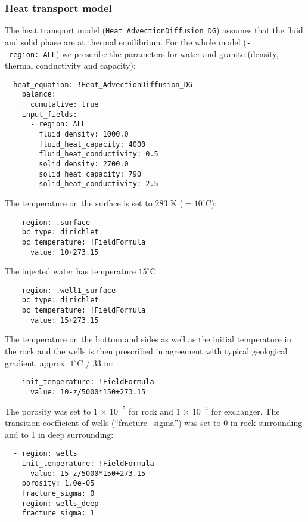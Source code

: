 \subsubsection{Heat transport model}\label{heat-transport-model}

The heat transport model (\texttt{Heat\_AdvectionDiffusion\_DG}) assumes
that the fluid and solid phase are at thermal equilibrium. For the whole
model (\texttt{-\ region:\ ALL}) we prescribe the parameters for water
and granite (density, thermal conductivity and capacity):

\begin{verbatim}
  heat_equation: !Heat_AdvectionDiffusion_DG
    balance:
      cumulative: true
    input_fields:
      - region: ALL
        fluid_density: 1000.0
        fluid_heat_capacity: 4000
        fluid_heat_conductivity: 0.5
        solid_density: 2700.0
        solid_heat_capacity: 790
        solid_heat_conductivity: 2.5
\end{verbatim}

The temperature on the surface is set to 283 K (\(=10^\circ\)C):

\begin{verbatim}
  - region: .surface
    bc_type: dirichlet
    bc_temperature: !FieldFormula
      value: 10+273.15
\end{verbatim}

The injected water has temperature \(15^\circ\)C:

\begin{verbatim}
  - region: .well1_surface
    bc_type: dirichlet
    bc_temperature: !FieldFormula
      value: 15+273.15
\end{verbatim}

The temperature on the bottom and sides as well as the initial
temperature in the rock and the wells is then prescribed in agreement
with typical geological gradient, approx. \(1^\circ\)C / 33 m:

\begin{verbatim}
    init_temperature: !FieldFormula
      value: 10-z/5000*150+273.15
\end{verbatim}

The porosity was set to 1 \(\times\) \(10^{-5}\) for rock and 1
\(\times\) \(10^{-4}\) for exchanger. The transition coefficient of
wells (``fracture\_sigma'') was set to 0 in rock surrounding and to 1 in
deep surrounding:

\begin{verbatim}
  - region: wells
    init_temperature: !FieldFormula
      value: 15-z/5000*150+273.15
    porosity: 1.0e-05
    fracture_sigma: 0
  - region: wells_deep
    fracture_sigma: 1
\end{verbatim}

